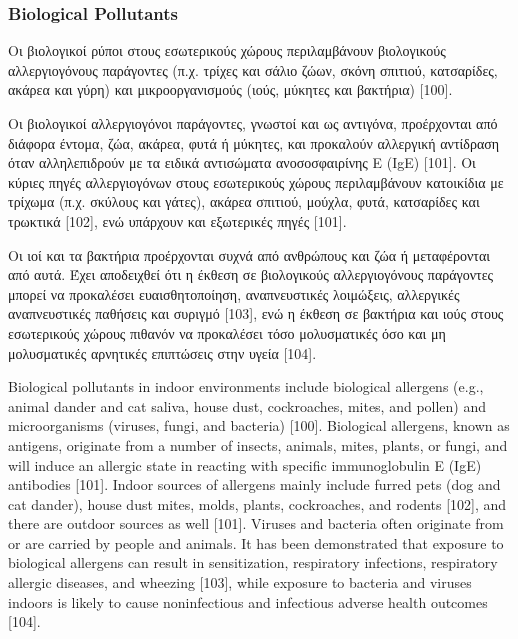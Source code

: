 \cite{ijerph17238972}



\subsubsection{ Biological Pollutants}


Οι βιολογικοί ρύποι στους εσωτερικούς χώρους περιλαμβάνουν βιολογικούς αλλεργιογόνους παράγοντες (π.χ. τρίχες και σάλιο ζώων, σκόνη σπιτιού, κατσαρίδες, ακάρεα και γύρη) και μικροοργανισμούς (ιούς, μύκητες και βακτήρια) [100].

Οι βιολογικοί αλλεργιογόνοι παράγοντες, γνωστοί και ως αντιγόνα, προέρχονται από διάφορα έντομα, ζώα, ακάρεα, φυτά ή μύκητες, και προκαλούν αλλεργική αντίδραση όταν αλληλεπιδρούν με τα ειδικά αντισώματα ανοσοσφαιρίνης Ε (IgE) [101]. Οι κύριες πηγές αλλεργιογόνων στους εσωτερικούς χώρους περιλαμβάνουν κατοικίδια με τρίχωμα (π.χ. σκύλους και γάτες), ακάρεα σπιτιού, μούχλα, φυτά, κατσαρίδες και τρωκτικά [102], ενώ υπάρχουν και εξωτερικές πηγές [101].

Οι ιοί και τα βακτήρια προέρχονται συχνά από ανθρώπους και ζώα ή μεταφέρονται από αυτά. Έχει αποδειχθεί ότι η έκθεση σε βιολογικούς αλλεργιογόνους παράγοντες μπορεί να προκαλέσει ευαισθητοποίηση, αναπνευστικές λοιμώξεις, αλλεργικές αναπνευστικές παθήσεις και συριγμό [103], ενώ η έκθεση σε βακτήρια και ιούς στους εσωτερικούς χώρους πιθανόν να προκαλέσει τόσο μολυσματικές όσο και μη μολυσματικές αρνητικές επιπτώσεις στην υγεία [104].

\cite{ijerph17238972}

Biological pollutants in indoor environments include biological allergens (e.g., animal dander and cat saliva, house dust, cockroaches, mites, and pollen) and microorganisms (viruses, fungi, and bacteria) [100]. Biological allergens, known as antigens, originate from a number of insects, animals, mites, plants, or fungi, and will induce an allergic state in reacting with specific immunoglobulin E (IgE) antibodies [101]. Indoor sources of allergens mainly include furred pets (dog and cat dander), house dust mites, molds, plants, cockroaches, and rodents [102], and there are outdoor sources as well [101]. Viruses and bacteria often originate from or are carried by people and animals. It has been demonstrated that exposure to biological allergens can result in sensitization, respiratory infections, respiratory allergic diseases, and wheezing [103], while exposure to bacteria and viruses indoors is likely to cause noninfectious and infectious adverse health outcomes [104].


\cite{ijerph17238972}
